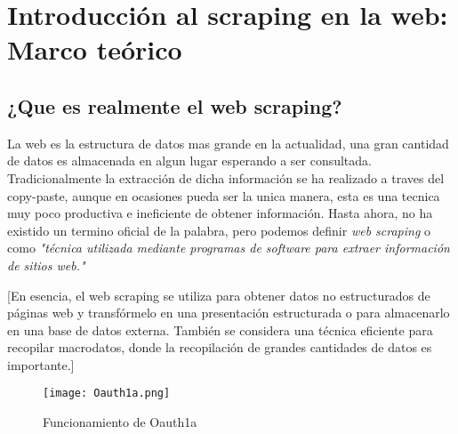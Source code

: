
\chapter{Introducción al scraping en la web: Marco teórico}
\label{cha:introduccion al scraping en la web} 

\section{¿Que es realmente el web scraping?}
\label{sec:Que es realmente el web scraping}


La web es la estructura de datos mas grande en la actualidad, una gran cantidad de datos es almacenada en 
algun lugar esperando a ser consultada. Tradicionalmente la extracción de dicha información se ha 
realizado a traves del copy-paste, aunque en ocasiones pueda ser la unica manera, esta es una tecnica muy
poco productiva e ineficiente de obtener información. Hasta ahora, no ha existido un termino oficial de la 
palabra, pero podemos definir \textit{web scraping} o como \emph{"técnica utilizada mediante 
programas de software para extraer información de sitios web."} \cite{web-scraping-wikipedia}

[En esencia, el web scraping se utiliza para obtener datos no estructurados de páginas web y
transfórmelo en una presentación estructurada o para almacenarlo en una base de datos externa.
También se considera una técnica eficiente para recopilar macrodatos, donde la recopilación de grandes cantidades de datos es importante.]

\begin{figure}[tphb]
  		   \centering
     		   \texttt{[image: Oauth1a.png]}
  		   \caption{Funcionamiento de Oauth1a}
  		   \label{img:oauth1a}
\end{figure}






